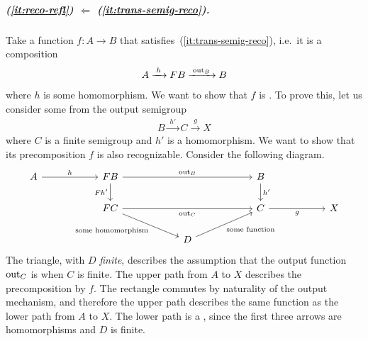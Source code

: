     
\subparagraph{
     (\ref{it:reco-refl}) $\Leftarrow$ (\ref{it:trans-semig-reco}).} Take a function $f\colon A \to B$ that satisfies~(\ref{it:trans-semig-reco}), i.e.~it is a composition 
\begin{align*}
    A \xrightarrow{\;h\;} \functor B \xrightarrow{\;\outfun_B\;} B
\end{align*}
where $h$ is some homomorphism.
We want to show that $f$ is . To prove this, let us
consider some  from the output semigroup 
\begin{align*}
    B \xrightarrow{\;h'\;} C \xrightarrow{\;g\;} X
\end{align*}
where $C$ is a finite semigroup and $h'$ is a homomorphism.
We want to show that its precomposition $f$ is also recognizable. Consider the following diagram. 
\[\begin{tikzcd}
    [column sep=2cm]
	A & {\functor B} & & B \\
	& {\functor C} & & C & X\\
    & & D
	\arrow["h", from=1-1, to=1-2]
	\arrow["\outfun_B", from=1-2, to=1-4]
	\arrow["{\functor h'}"', from=1-2, to=2-2]
	\arrow["\outfun_C"', from=2-2, to=2-4]
	\arrow["h'", from=1-4, to=2-4]
	\arrow["g"', from=2-4, to=2-5]
    \arrow["\text{some homomorphism}"', from=2-2, to=3-3]
    \arrow["\text{some function}"', from=3-3, to=2-4]
\end{tikzcd}\]
The triangle, with $D$ \emph{finite}, describes  the assumption that the output function $\mathrm{out}_C$ is  when $C$ is finite.
The upper path from $A$ to $X$ describes the precomposition by $f$. 
 The  rectangle commutes by naturality of the output mechanism, and therefore the upper path describes the same function as the lower path from $A$ to $X$. The lower path is a , since the first three arrows are homomorphisms and $D$ is finite.
